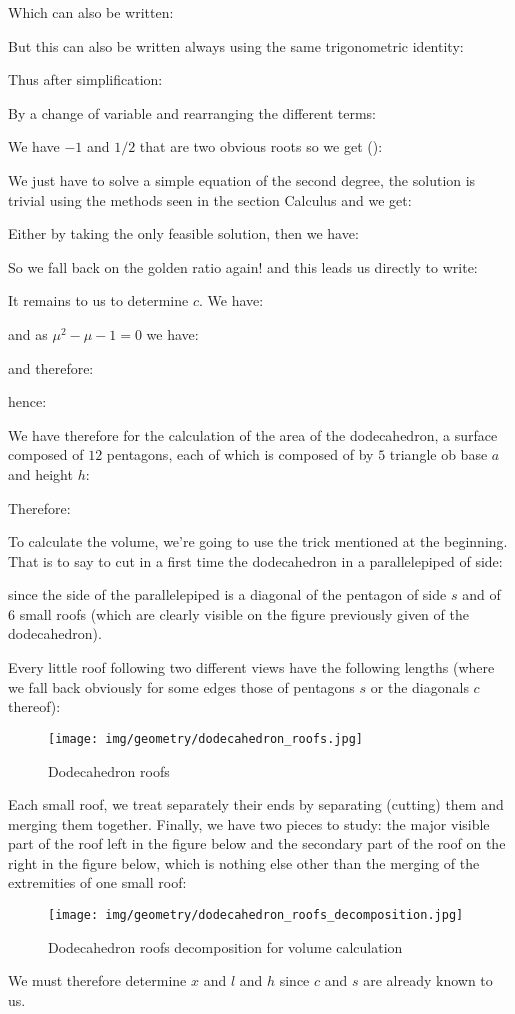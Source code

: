 {	Which can also be written:
	
	But this can also be written always using the same trigonometric identity:
	
	Thus after simplification:
	
	By a change of variable and rearranging the different terms:
	
	We have $-1$ and $1/2$ that are two obvious roots so we get ():
	
	We just have to solve a simple equation of the second degree, the solution is trivial using the methods seen in the section Calculus and we get:
	
	Either by taking the only feasible solution, then we have:
	
	So we fall back on the golden ratio again! and this leads us directly to write:
	
	It remains to us to determine $c$. We have:
	
	and as $\mu^2-\mu-1=0$ we have:
	
	and therefore:
	
	hence:
	
	We have therefore for the calculation of the area of the dodecahedron, a surface composed of $12$ pentagons, each of which is composed of by $5$ triangle ob base $a$ and  height $h$:
		
	Therefore:
	
	To calculate the volume, we're going to use the trick mentioned at the beginning. That is to say to cut in a first time the dodecahedron in a parallelepiped of side:
	
	since the side of the parallelepiped is a diagonal of the pentagon of side $s$ and of $6$ small roofs (which are clearly visible on the figure previously given of the dodecahedron).
	
	Every little roof following two different views have the following lengths (where we fall back obviously for some edges those of pentagons $s$ or the diagonals $c$ thereof): 
	\begin{figure}[H]
		\centering
		\texttt{[image: img/geometry/dodecahedron\_roofs.jpg]}
		\caption[]{Dodecahedron roofs}
	\end{figure}
	Each small roof, we treat separately their ends by separating (cutting) them and merging them together. Finally, we have two pieces to study: the major visible part of the roof left in the figure below and the secondary part of the roof on the right in the figure below, which is nothing else other than the merging of the extremities of one small roof:
	\begin{figure}[H]
		\centering
		\texttt{[image: img/geometry/dodecahedron\_roofs\_decomposition.jpg]}
		\caption[]{Dodecahedron roofs decomposition for volume calculation}
	\end{figure}
	We must therefore determine $x$ and $l$ and $h$ since $c$ and $s$ are already known to us.

}
